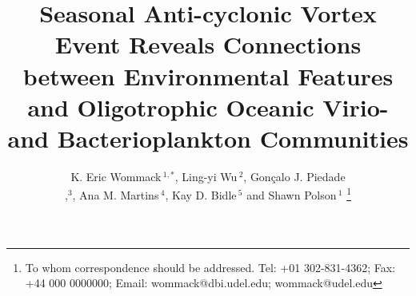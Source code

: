 \documentclass[a4,center,fleqn]{NAR}
\begin{document}
\title{Seasonal Anti-cyclonic Vortex Event Reveals Connections between Environmental Features and Oligotrophic Oceanic Virio- and Bacterioplankton Communities}

\author{%
K. Eric Wommack\,$^{1,*}$,
Ling-yi Wu\,$^{2}$,
Gonçalo J. Piedade\\,$^{3}$,
Ana M. Martins\,$^{4}$,
Kay D. Bidle\,$^{5}$%
and Shawn Polson\,$^{1}$%
\footnote{To whom correspondence should be addressed.
Tel: +01 302-831-4362; Fax: +44 000 0000000; Email: wommack@dbi.udel.edu; wommack@udel.edu}}

\address{%
$^{1}$Center for Bioinformatics and Computational Biology, University of Delaware, 15 Innovation Way， Newark, DE, 19711， United States,
$^{2}$Department of Water Science and Policy, College of Agriculture and Natural Resources, University of Delaware, Newark, DE,  19716, United States,
$^{3}$Department of Marine Microbiology, NIOZ Royal Netherlands Institute for Sea Research, Den Burg, Texel, 1790 AB , Netherlands,
$^{4}$Department of Oceanography and Fisheries, University of the Azores, Ponta Delgada, Regiao Autonoma dos Acores, Portugal and
$^{5}$Department of Marine and Coastal Sciences, Rutgers University, 71 Dudley Rd., New Brunswick, NJ, 08901, United States}


\maketitle
\end{document}
